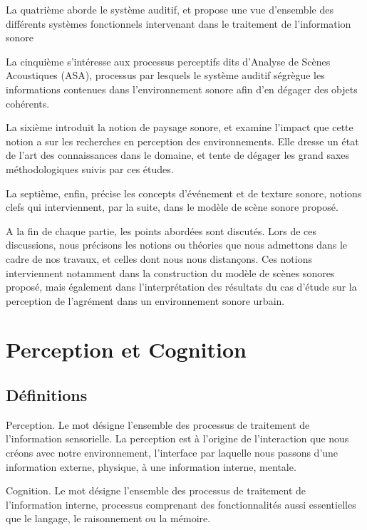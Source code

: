 La quatrième aborde le système auditif, et propose une vue d'ensemble des différents systèmes fonctionnels intervenant dans le traitement de l'information sonore 

La cinquième s'intéresse aux processus perceptifs dits d'Analyse de Scènes Acoustiques (ASA), processus par lesquels le système auditif ségrègue les informations contenues dans l'environnement sonore afin d'en dégager des objets cohérents.
 
La sixième introduit la notion de paysage sonore, et examine l'impact que cette notion a sur les recherches en perception des environnements. Elle dresse un état de l'art des connaissances dans le domaine, et tente de dégager les grand saxes méthodologiques suivis par ces études.

La septième, enfin, précise les concepts d'événement et de texture sonore, notions clefs qui interviennent, par la suite, dans le modèle de scène sonore proposé.

A la fin de chaque partie, les points abordées sont discutés. Lors de ces discussions, nous précisons les notions ou théories que nous admettons dans le cadre de nos travaux, et celles dont nous nous distançons. Ces notions interviennent notamment dans la construction du modèle de scènes sonores proposé, mais également dans l'interprétation des résultats du cas d'étude sur la perception de l'agrément dans un environnement sonore urbain.

\section{Perception et Cognition}
\label{sec:ch3_perceptionCognition}

\subsection{Définitions}
\label{sec:ch3_perceptionCognitionDef}


Perception. Le mot désigne l'ensemble des processus de traitement de l'information sensorielle. La perception est à l'origine de l'interaction que nous créons avec notre environnement, l'interface par laquelle nous passons d'une information externe, physique, à une information interne, mentale.

Cognition. Le mot désigne l'ensemble des processus de traitement de l'information interne, processus comprenant des fonctionnalités aussi essentielles que le langage, le raisonnement ou la mémoire.

